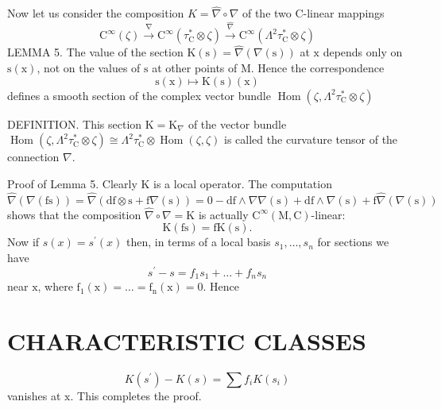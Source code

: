 \documentclass[10pt]{article}
\begin{document}
Now let us consider the composition $K=\widehat{\nabla} \circ \nabla$ of the two C-linear mappings
$$
\mathrm{C}^{\infty}(\zeta) \stackrel{\nabla}{\longrightarrow} \mathrm{C}^{\infty}\left(\tau_{\mathrm{C}}^{*} \otimes \zeta\right) \stackrel{\widehat{\nabla}}{\longrightarrow} \mathrm{C}^{\infty}\left(\Lambda^{2} \tau_{\mathrm{C}}^{*} \otimes \zeta\right)
$$
LEMMA 5. The value of the section $\mathrm{K}(\mathrm{s})=\hat{\nabla}(\nabla(\mathrm{s}))$ at $\mathrm{x}$ depends only on $\mathrm{s}(\mathrm{x})$, not on the values of $\mathrm{s}$ at other points of $\mathrm{M}$. Hence the correspondence
$$
\mathrm{s}(\mathrm{x}) \mapsto \mathrm{K}(\mathrm{s})(\mathrm{x})
$$
defines a smooth section of the complex vector bundle $\operatorname{Hom}\left(\zeta, \Lambda^{2} \tau_{\mathrm{C}}^{*} \otimes \zeta\right)$

DEFINITION. This section $\mathrm{K}=\mathrm{K}_{\nabla}$ of the vector bundle $\operatorname{Hom}\left(\zeta, \Lambda^{2} \tau_{\mathrm{C}}^{*} \otimes \zeta\right) \cong \Lambda^{2} \tau_{\mathrm{C}}^{*} \otimes \operatorname{Hom}(\zeta, \zeta)$ is called the curvature tensor of the connection $\nabla$.

Proof of Lemma 5. Clearly $\mathrm{K}$ is a local operator. The computation $\hat{\nabla}(\nabla(\mathrm{fs}))=\hat{\nabla}(\mathrm{df} \otimes \mathrm{s}+\mathrm{f} \nabla(\mathrm{s}))=0-\mathrm{df} \wedge \nabla \nabla(\mathrm{s})+\mathrm{df} \wedge \nabla(\mathrm{s})+\mathrm{f} \hat{\nabla}(\nabla(\mathrm{s}))$ shows that the composition $\hat{\nabla} \circ \nabla=\mathrm{K}$ is actually $\mathrm{C}^{\infty}(\mathrm{M}, \mathrm{C})$-linear:
$$
\mathrm{K}(\mathrm{fs})=\mathrm{fK}(\mathrm{s}) .
$$
Now if $s(x)=s^{\prime}(x)$ then, in terms of a local basis $s_{1}, \ldots, s_{n}$ for sections we have
$$
s^{\prime}-s=f_{1} s_{1}+\ldots+f_{n} s_{n}
$$
near $\mathrm{x}$, where $\mathrm{f}_{1}(\mathrm{x})=\ldots=\mathrm{f}_{\mathrm{n}}(\mathrm{x})=0$. Hence

\section{CHARACTERISTIC CLASSES}
$$
K\left(s^{\prime}\right)-K(s)=\sum f_{i} K\left(s_{i}\right)
$$
vanishes at $\mathrm{x}$. This completes the proof.
\end{document}
